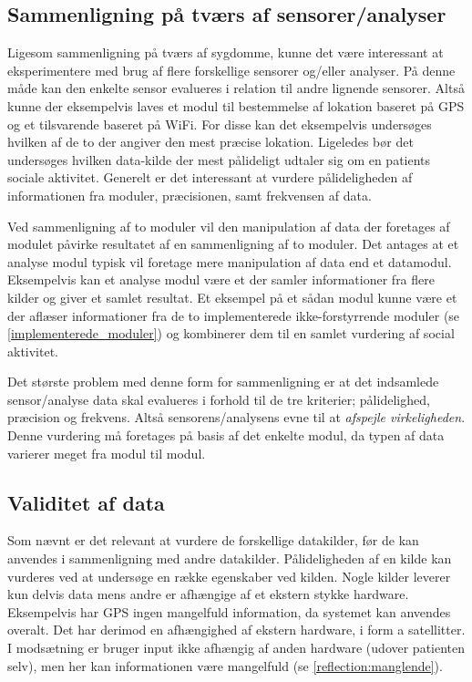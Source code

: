 \subsection{Sammenligning på tværs af sensorer/analyser}
Ligesom sammenligning på tværs af sygdomme, kunne det være interessant at eksperimentere med brug af flere forskellige sensorer og/eller analyser.
På denne måde kan den enkelte sensor evalueres i relation til andre lignende sensorer.
Altså kunne der eksempelvis laves et modul til bestemmelse af lokation baseret på GPS og et tilsvarende baseret på WiFi.
For disse kan det eksempelvis undersøges hvilken af de to der angiver den mest præcise lokation.
Ligeledes bør det undersøges hvilken data-kilde der mest pålideligt udtaler sig om en patients sociale aktivitet.
Generelt er det interessant at vurdere pålideligheden af informationen fra moduler, præcisionen, samt frekvensen af data.

Ved sammenligning af to moduler vil den manipulation af data der foretages af modulet påvirke resultatet af en sammenligning af to moduler.
Det antages at et analyse modul typisk vil foretage mere manipulation af data end et datamodul.
Eksempelvis kan et analyse modul være et der samler informationer fra flere kilder og giver et samlet resultat.
Et eksempel på et sådan modul kunne være et der aflæser informationer fra de to implementerede ikke-forstyrrende moduler (se \cref{implementerede_moduler}) og kombinerer dem til en samlet vurdering af social aktivitet.

Det største problem med denne form for sammenligning er at det indsamlede sensor/analyse data skal evalueres i forhold til de tre kriterier; pålidelighed, præcision og frekvens.
Altså sensorens/analysens evne til at \textit{afspejle virkeligheden}.
Denne vurdering må foretages på basis af det enkelte modul, da typen af data varierer meget fra modul til modul.

\subsection{Validitet af data}
Som nævnt er det relevant at vurdere de forskellige datakilder, før de kan anvendes i sammenligning med andre datakilder.
Pålideligheden af en kilde kan vurderes ved at undersøge en række egenskaber ved kilden.
Nogle kilder leverer kun delvis data mens andre er afhængige af et ekstern stykke hardware.
Eksempelvis har GPS ingen mangelfuld information, da systemet kan anvendes overalt.
Det har derimod en afhængighed af ekstern hardware, i form a satellitter.
I modsætning er bruger input ikke afhængig af anden hardware (udover patienten selv), men her kan informationen være mangelfuld (se \cref{reflection:manglende}).

